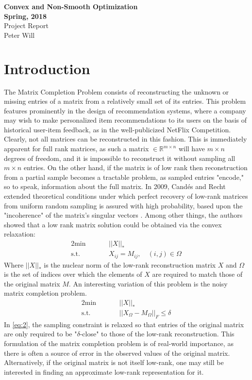 \documentclass{article}
\begin{document}
\begin{center}
{\bf
Convex and Non-Smooth Optimization \\
Spring, 2018 \\
}
Project Report \\
Peter Will
\end{center}
\vspace{.2in}
\section{Introduction} \label{introduction}
The Matrix Completion Problem consists of reconstructing the unknown or missing entries of a matrix from a relatively small set of its entries.  This problem features prominently in the design of recommendation systems, where a company may wish to make personalized item recommendations to its users on the basis of historical user-item feedback, as in the well-publicized NetFlix Competition.  Clearly, not all matrices can be reconstructed in this fashion.  This is immediately apparent for full rank matrices, as such a matrix $\in \mathbb{R}^{m \times n}$ will have $m \times n$ degrees of freedom, and it is impossible to reconstruct it without sampling all $m \times n$ entries.  On the other hand, if the matrix is of low rank then reconstruction from a partial sample becomes a tractable problem, as  sampled entries "encode," so to speak, information about the full matrix.  In 2009, Cand\'es and Recht extended theoretical conditions under which perfect recovery of low-rank matrices from uniform random sampling is assured with high probability, based upon the "incoherence" of the matrix's singular vectors \cite{Cand}.  Among other things, the authors showed that a low rank matrix solution could be obtained via the convex relaxation:
\begin{alignat}{2} \label{eq:1}
\textrm{min}& \quad &&||X||_* \\
\textrm{s.t.}& &&X_{ij} = M_{ij}, \quad (i,j) \in \Omega \nonumber
\end{alignat}
Where $||X||_*$ is the nuclear norm of the low-rank reconstruction matrix $X$ and $\Omega$ is the set of indices over which the elements of $X$ are required to match those of the original matrix $M$.  An interesting variation of this problem is the noisy matrix completion problem.
\begin{alignat}{2} \label{eq:2}
\textrm{min}& \quad &&||X||_* \\
\textrm{s.t.}& &&||X_{\Omega} - M_{\Omega}||_F \le \delta \nonumber
\end{alignat}
In \ref{eq:2}, the sampling constraint is relaxed so that entries of the original matrix are only required to be "$\delta$-close" to those of the low-rank reconstruction.  This formulation of the matrix completion problem is of real-world importance, as there is often a source of error in the observed values of the original matrix.  Alternatively, if the original matrix is not itself low-rank, one may still be interested in finding an approximate low-rank representation for it.  
\end{document}
